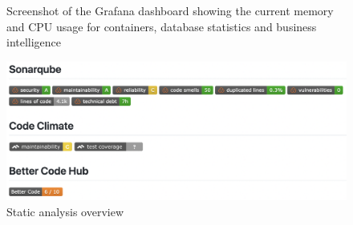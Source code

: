 \documentclass{article}
\begin{document}
\begin{figure}[H]
   \centering
   \caption{Screenshot of the Grafana dashboard showing the current memory and CPU usage for containers, database statistics and business intelligence}
\end{figure}

\begin{figure}[H]
   \centering
    \includegraphics[width=\textwidth]{static analysis.png}
   \caption{Static analysis overview}
   \label{appendix:static_analysis}
\end{figure}
\newpage
\end{document}
